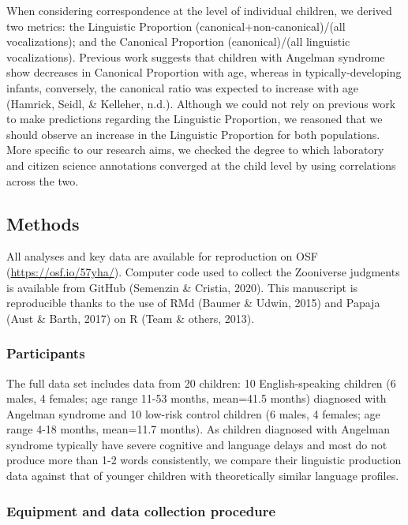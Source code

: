\documentclass[english,,man,floatsintext]{apa6}
\begin{document}
When considering correspondence at the level of individual children, we derived two metrics: the Linguistic Proportion (canonical+non-canonical)/(all vocalizations); and the Canonical Proportion (canonical)/(all linguistic vocalizations). Previous work suggests that children with Angelman syndrome show decreases in Canonical Proportion with age, whereas in typically-developing infants, conversely, the canonical ratio was expected to increase with age (Hamrick, Seidl, \& Kelleher, n.d.). Although we could not rely on previous work to make predictions regarding the Linguistic Proportion, we reasoned that we should observe an increase in the Linguistic Proportion for both populations. More specific to our research aims, we checked the degree to which laboratory and citizen science annotations converged at the child level by using correlations across the two.

\hypertarget{methods}{%
\subsection{Methods}\label{methods}}

All analyses and key data are available for reproduction on OSF (\url{https://osf.io/57yha/}). Computer code used to collect the Zooniverse judgments is available from GitHub (Semenzin \& Cristia, 2020). This manuscript is reproducible thanks to the use of RMd (Baumer \& Udwin, 2015) and Papaja (Aust \& Barth, 2017) on R (Team \& others, 2013).

\hypertarget{participants}{%
\subsubsection{Participants}\label{participants}}

The full data set includes data from 20 children: 10 English-speaking children (6 males, 4 females; age range 11-53 months, mean=41.5 months) diagnosed with Angelman syndrome and 10 low-risk control children (6 males, 4 females; age range 4-18 months, mean=11.7 months). As children diagnosed with Angelman syndrome typically have severe cognitive and language delays and most do not produce more than 1-2 words consistently, we compare their linguistic production data against that of younger children with theoretically similar language profiles.

\hypertarget{equipment-and-data-collection-procedure}{%
\subsubsection{Equipment and data collection procedure}\label{equipment-and-data-collection-procedure}}
\end{document}
